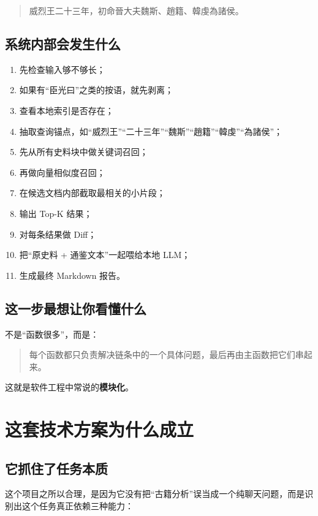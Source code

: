 \documentclass[12pt,a4paper]{ctexart}
\newcommand{\term}[1]{\textbf{#1}}
\begin{document}
\begin{quote}
威烈王二十三年，初命晉大夫魏斯、趙籍、韓虔為諸侯。
\end{quote}

\subsection{系统内部会发生什么}

\begin{enumerate}
  \item 先检查输入够不够长；
  \item 如果有“臣光曰”之类的按语，就先剥离；
  \item 查看本地索引是否存在；
  \item 抽取查询锚点，如“威烈王”“二十三年”“魏斯”“趙籍”“韓虔”“為諸侯”；
  \item 先从所有史料块中做关键词召回；
  \item 再做向量相似度召回；
  \item 在候选文档内部截取最相关的小片段；
  \item 输出 Top-K 结果；
  \item 对每条结果做 Diff；
  \item 把“原史料 + 通鉴文本”一起喂给本地 LLM；
  \item 生成最终 Markdown 报告。
\end{enumerate}

\subsection{这一步最想让你看懂什么}

不是“函数很多”，而是：

\begin{quote}
每个函数都只负责解决链条中的一个具体问题，最后再由主函数把它们串起来。
\end{quote}

这就是软件工程中常说的\term{模块化}。

\section{这套技术方案为什么成立}

\subsection{它抓住了任务本质}

这个项目之所以合理，是因为它没有把“古籍分析”误当成一个纯聊天问题，而是识别出这个任务真正依赖三种能力：
\end{document}
